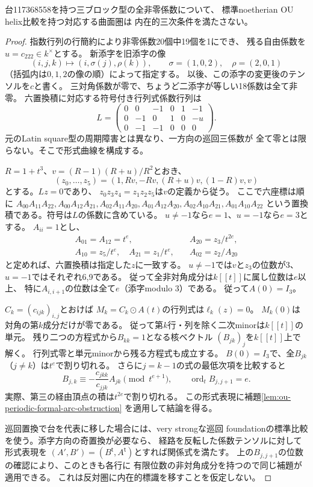 \begin{theorem}
\label{thm:ou-seven-zero-formal-arc-exclusion}
台117368558を持つ三ブロック型の全非零係数について、
標準noetherian OU helix比較を持つ対応する曲面圏は
内在的三次条件を満たさない。
\end{theorem}
\begin{proof}
指数行列の行簡約により非零係数20個中19個を1にでき、
残る自由係数を$u=c_{222}\in k^\times$とする。
新添字を旧添字の像
\[
 (i,j,k)\longmapsto(i,\sigma(j),\rho(k)),\qquad
 \sigma=(1,0,2),\quad \rho=(2,0,1)
\]
（括弧内は$0,1,2$の像の順）によって指定する。
以後、この添字の変更後のテンソルを$c$と書く。
三対角係数が零で、ちょうど二添字が等しい18係数は全て非零。
六置換積に対応する符号付き行列式係数行列は
\[
 L=\begin{pmatrix}
 0&0&-1&0&1&-1\\
 0&-1&0&1&0&-u\\
 0&-1&-1&0&0&0
 \end{pmatrix}.
\]
元のLatin square型の周期障害とは異なり、一方向の巡回三係数が
全て零とは限らない。そこで形式曲線を構成する。

$R=1+t^3$、$v=(R-1)(R+u)/R^2$とおき、
\[
 (z_0,\ldots,z_5)=(1,Rv,-Rv,(R+u)v,(1-R)v,v)
\]
とする。$Lz=0$であり、
$z_0z_3z_4=z_1z_2z_5$は$v$の定義から従う。
ここで六座標は順に
$A_{00}A_{11}A_{22},A_{00}A_{12}A_{21},A_{02}A_{11}A_{20},
A_{01}A_{12}A_{20},A_{02}A_{10}A_{21},A_{01}A_{10}A_{22}$
という置換積である。符号は$L$の係数に含めている。
$u\ne-1$なら$e=1$、$u=-1$なら$e=3$とする。
$A_{ii}=1$とし、
\[
 \begin{split}
 A_{01}=A_{12}=t^e,\quad&A_{20}=z_3/t^{2e},\\
 A_{10}=z_5/t^e,\quad A_{21}=z_1/t^e,\quad&
 A_{02}=z_2/A_{20}
 \end{split}
\]
と定めれば、六置換積は指定した$z$に一致する。
$u\ne-1$では$v$と$z_3$の位数が3、
$u=-1$ではそれぞれ6,9である。
従って全非対角成分は$k[[t]]$に属し位数は$e$以上、
特に$A_{i,i+1}$の位数は全て$e$（添字modulo 3）である。
従って$A(0)=I_3$。

$C_k=(c_{ijk})_{i,j}$とおけば
$M_k=C_k\odot A(t)$の行列式は$\ell_k(z)=0$。
$M_k(0)$は対角の第$k$成分だけが零である。
従って第$k$行・列を除く二次minorは$k[[t]]$の単元。
残り二つの方程式から$B_{kk}=1$となる核ベクトル
$(B_{jk})_j$を$k[[t]]$上で解く。
行列式零と単元minorから残る方程式も成立する。
$B(0)=I_3$で、全$B_{jk}$（$j\ne k$）は$t^e$で割り切れる。
さらに$j=k-1$の式の最低次項を比較すると
\[
 B_{j,k}\equiv
 -\frac{c_{jkk}}{c_{jjk}} A_{jk}\pmod{t^{e+1}},
 \qquad \operatorname{ord}_t B_{j,j+1}=e .
\]
実際、第三の経由頂点の積は$t^{2e}$で割り切れる。
この形式表現に補題\ref{lem:ou-periodic-formal-arc-obstruction}
を適用して結論を得る。

巡回置換で台を代表に移した場合には、very strongな巡回
foundationの標準比較を使う。添字方向の奇置換が必要なら、
経路を反転した係数テンソルに対して形式表現を
$(A',B')=(B^{\mathsf t},A^{\mathsf t})$とすれば関係式を満たす。
上の$B_{j,j+1}$の位数の確認により、このときも各行に
有限位数の非対角成分を持つので同じ補題が適用できる。
これは反対圏に内在的標識を移すことを仮定しない。
\end{proof}

